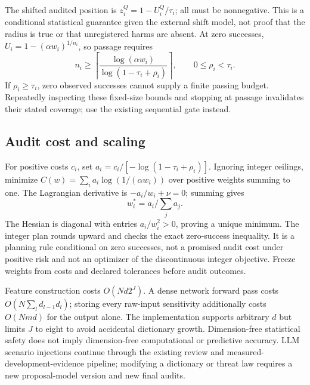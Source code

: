 The shifted audited position is $z_i^Q=1-U_i^Q/\tau_i$; all must be nonnegative.
This is a conditional statistical guarantee given the external shift model,
not proof that the radius is true or that unregistered harms are absent.
At zero successes, $U_i=1-(\alpha w_i)^{1/n_i}$, so passage requires
\begin{equation}
 n_i\ge\left\lceil\frac{\log(\alpha w_i)}
 {\log(1-\tau_i+\rho_i)}\right\rceil,\qquad 0\le\rho_i<\tau_i.
\end{equation}
If $\rho_i\ge\tau_i$, zero observed successes cannot supply a finite passing
budget. Repeatedly inspecting these fixed-size bounds and stopping at passage
invalidates their stated coverage; use the existing sequential gate instead.

\subsection{Audit cost and scaling}
For positive costs $c_i$, set $a_i=c_i/[-\log(1-\tau_i+\rho_i)]$.
Ignoring integer ceilings, minimize
$C(w)=\sum_i a_i\log(1/(\alpha w_i))$ over positive weights summing to one.
The Lagrangian derivative is $-a_i/w_i+\nu=0$; summing gives
\begin{equation}
 w_i^*=a_i/\sum_ja_j.
\end{equation}
The Hessian is diagonal with entries $a_i/w_i^2>0$, proving a unique minimum.
The integer plan rounds upward and checks the exact zero-success inequality.
It is a planning rule conditional on zero successes, not a promised audit cost
under positive risk and not an optimizer of the discontinuous integer objective.
Freeze weights from costs and declared tolerances before audit outcomes.

Feature construction costs $O(Nd2^J)$. A dense network forward pass costs
$O(N\sum_l d_{l-1}d_l)$; storing every raw-input sensitivity additionally costs
$O(Nmd)$ for the output alone. The implementation supports arbitrary $d$ but
limits $J$ to eight to avoid accidental dictionary growth. Dimension-free
statistical safety does not imply dimension-free computational or predictive
accuracy. LLM scenario injections continue through the existing review and
measured-development-evidence pipeline; modifying a dictionary or threat law
requires a new proposal-model version and new final audits.
